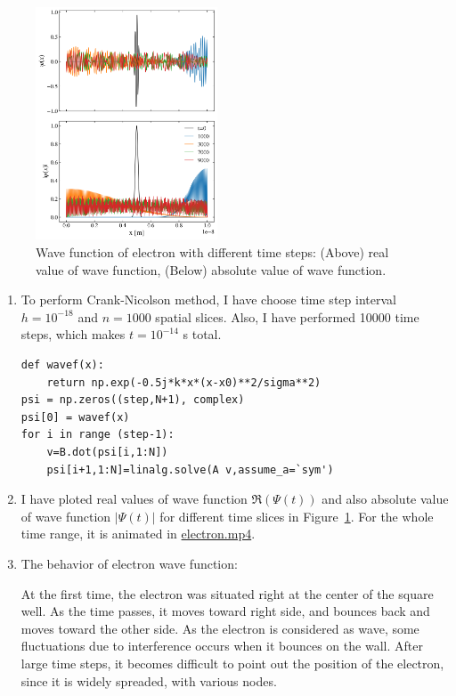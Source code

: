 \documentclass[reprint, nofootinbib]{revtex4-2} %
\begin{document}
\begin{figure}[t]
	\includegraphics[width=0.48\textwidth]{fin_3}
	\caption{Wave function of electron with different time steps: (Above) real value of wave function, (Below) absolute value of wave function.}
	\label{fig:fin3}
\end{figure}

\begin{enumerate}
	\item To perform Crank-Nicolson method, I have choose time step interval $h = 10^{-18}$ and $n = 1000$ spatial slices. Also, I have performed 10000 time steps, which makes $t = 10^{-14}$ s total.

\begin{Verbatim}[tabsize = 3]
def wavef(x):
	return np.exp(-0.5j*k*x*(x-x0)**2/sigma**2)
psi = np.zeros((step,N+1), complex)
psi[0] = wavef(x)
for i in range (step-1):
	v=B.dot(psi[i,1:N])
	psi[i+1,1:N]=linalg.solve(A v,assume_a=`sym')
\end{Verbatim}

\item I have ploted real values of wave function $\Re(\Psi(t))$ and also absolute value of wave function $|\Psi(t)|$ for different time slices in Figure~\ref{fig:fin3}. For the whole time range, it is animated in \url{electron.mp4}.

\item The behavior of electron wave function:

At the first time, the electron was situated right at the center of the square well. As the time passes, it moves toward right side, and bounces back and moves toward the other side. 
As the electron is considered as wave, some fluctuations due to interference occurs when it bounces on the wall.
After large time steps, it becomes difficult to point out the position of the electron, since it is widely spreaded, with various nodes.
\end{enumerate}






%
\end{document}
